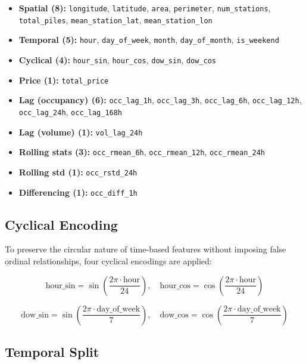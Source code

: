 \documentclass[12pt,a4paper]{article}
\begin{document}
\begin{itemize}
    \item \textbf{Spatial (8):} \texttt{longitude}, \texttt{latitude}, \texttt{area}, \texttt{perimeter}, \texttt{num\_stations}, \texttt{total\_piles}, \texttt{mean\_station\_lat}, \texttt{mean\_station\_lon}
    \item \textbf{Temporal (5):} \texttt{hour}, \texttt{day\_of\_week}, \texttt{month}, \texttt{day\_of\_month}, \texttt{is\_weekend}
    \item \textbf{Cyclical (4):} \texttt{hour\_sin}, \texttt{hour\_cos}, \texttt{dow\_sin}, \texttt{dow\_cos}
    \item \textbf{Price (1):} \texttt{total\_price}
    \item \textbf{Lag (occupancy) (6):} \texttt{occ\_lag\_1h}, \texttt{occ\_lag\_3h}, \texttt{occ\_lag\_6h}, \texttt{occ\_lag\_12h}, \texttt{occ\_lag\_24h}, \texttt{occ\_lag\_168h}
    \item \textbf{Lag (volume) (1):} \texttt{vol\_lag\_24h}
    \item \textbf{Rolling stats (3):} \texttt{occ\_rmean\_6h}, \texttt{occ\_rmean\_12h}, \texttt{occ\_rmean\_24h}
    \item \textbf{Rolling std (1):} \texttt{occ\_rstd\_24h}
    \item \textbf{Differencing (1):} \texttt{occ\_diff\_1h}
\end{itemize}

\subsection{Cyclical Encoding}

To preserve the circular nature of time-based features without imposing false
ordinal relationships, four cyclical encodings are applied:

\begin{equation}
\text{hour\_sin} = \sin\!\left(\frac{2\pi \cdot \text{hour}}{24}\right), \quad
\text{hour\_cos} = \cos\!\left(\frac{2\pi \cdot \text{hour}}{24}\right)
\end{equation}

\begin{equation}
\text{dow\_sin} = \sin\!\left(\frac{2\pi \cdot \text{day\_of\_week}}{7}\right), \quad
\text{dow\_cos} = \cos\!\left(\frac{2\pi \cdot \text{day\_of\_week}}{7}\right)
\end{equation}

\subsection{Temporal Split}
\end{document}
